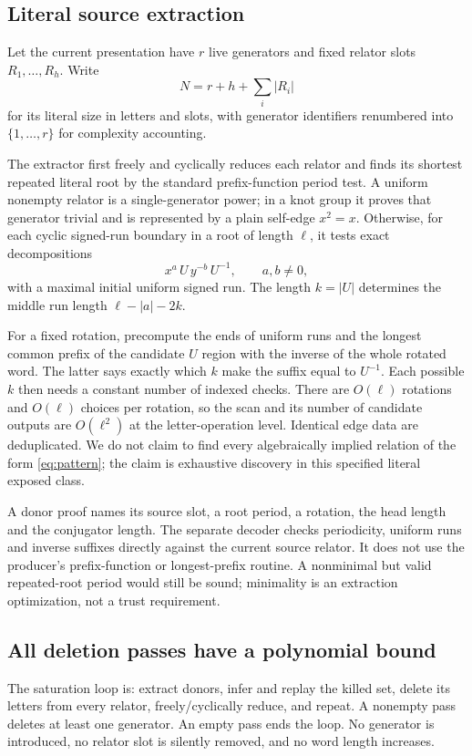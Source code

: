 \documentclass[11pt]{article}
\theoremstyle{definition}\newtheorem{definition}[theorem]{Definition}
\theoremstyle{remark}\newtheorem{remark}[theorem]{Remark}
\begin{document}
\subsection{Literal source extraction}
Let the current presentation have $r$ live generators and fixed relator
slots $R_1,\ldots,R_h$. Write
\[
 N=r+h+\sum_i |R_i|
\]
for its literal size in letters and slots, with generator identifiers
renumbered into $\{1,\ldots,r\}$ for complexity accounting.

The extractor first freely and cyclically reduces each relator and finds
its shortest repeated literal root by the standard prefix-function period
test. A uniform nonempty relator is a single-generator power; in a
knot group it proves that generator trivial and is represented by a
plain self-edge $x^2=x$. Otherwise, for each cyclic signed-run boundary
in a root of length $\ell$, it tests exact decompositions
\begin{equation}\label{eq:pattern}
 x^a\,U\,y^{-b}\,U^{-1},\qquad a,b\ne0,
\end{equation}
with a maximal initial uniform signed run. The length $k=|U|$ determines
the middle run length $\ell-|a|-2k$.

For a fixed rotation, precompute the ends of uniform runs and the longest
common prefix of the candidate $U$ region with the inverse of the whole
rotated word. The latter says exactly which $k$ make the suffix equal
to $U^{-1}$. Each possible $k$ then needs a constant number of indexed
checks. There are $O(\ell)$ rotations and $O(\ell)$ choices per rotation,
so the scan and its number of candidate outputs are $O(\ell^2)$ at the
letter-operation level. Identical edge data are deduplicated. We do not
claim to find every algebraically implied relation of the form
\eqref{eq:pattern}; the claim is exhaustive discovery in this specified
literal exposed class.

A donor proof names its source slot, a root period, a rotation, the head
length and the conjugator length. The separate decoder checks periodicity,
uniform runs and inverse suffixes directly against the current source
relator. It does not use the producer's prefix-function or longest-prefix
routine. A nonminimal but valid repeated-root period would still be sound;
minimality is an extraction optimization, not a trust requirement.

\subsection{All deletion passes have a polynomial bound}
The saturation loop is: extract donors, infer and replay the killed set,
delete its letters from every relator, freely/cyclically reduce, and repeat.
A nonempty pass deletes at least one generator. An empty pass ends the loop.
No generator is introduced, no relator slot is silently removed, and no
word length increases.
\end{document}
